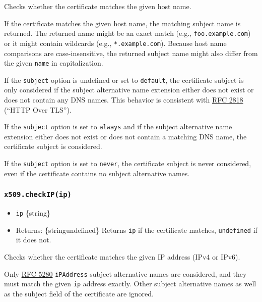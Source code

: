 Checks whether the certificate matches the given host name.

If the certificate matches the given host name, the matching subject
name is returned. The returned name might be an exact match (e.g.,
\texttt{foo.example.com}) or it might contain wildcards (e.g.,
\texttt{*.example.com}). Because host name comparisons are
case-insensitive, the returned subject name might also differ from the
given \texttt{name} in capitalization.

If the \texttt{\textquotesingle{}subject\textquotesingle{}} option is
undefined or set to
\texttt{\textquotesingle{}default\textquotesingle{}}, the certificate
subject is only considered if the subject alternative name extension
either does not exist or does not contain any DNS names. This behavior
is consistent with \href{https://www.rfc-editor.org/rfc/rfc2818.txt}{RFC
2818} (``HTTP Over TLS'').

If the \texttt{\textquotesingle{}subject\textquotesingle{}} option is
set to \texttt{\textquotesingle{}always\textquotesingle{}} and if the
subject alternative name extension either does not exist or does not
contain a matching DNS name, the certificate subject is considered.

If the \texttt{\textquotesingle{}subject\textquotesingle{}} option is
set to \texttt{\textquotesingle{}never\textquotesingle{}}, the
certificate subject is never considered, even if the certificate
contains no subject alternative names.

\subsubsection{\texorpdfstring{\texttt{x509.checkIP(ip)}}{x509.checkIP(ip)}}\label{x509.checkipip}

\begin{itemize}
\tightlist
\item
  \texttt{ip} \{string\}
\item
  Returns: \{string\textbar undefined\} Returns \texttt{ip} if the
  certificate matches, \texttt{undefined} if it does not.
\end{itemize}

Checks whether the certificate matches the given IP address (IPv4 or
IPv6).

Only \href{https://www.rfc-editor.org/rfc/rfc5280.txt}{RFC 5280}
\texttt{iPAddress} subject alternative names are considered, and they
must match the given \texttt{ip} address exactly. Other subject
alternative names as well as the subject field of the certificate are
ignored.

